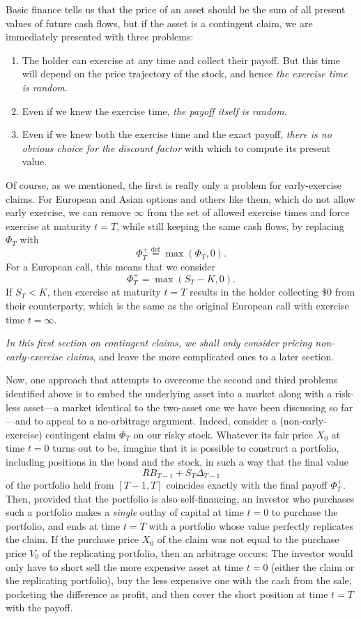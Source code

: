 \documentclass[reqno]{amsart}
\theoremstyle{definition}
\numberwithin{equation}{section}
\begin{document}
Basic finance tells us that the price of an asset should be the sum of all present values of future cash flows, but if the asset is a contingent claim, we are immediately presented with three problems:
\begin{enumerate}
\item The holder can exercise at any time and collect their payoff. But this time will depend on the price trajectory of the stock, and hence \textit{the exercise time is random.}
\item Even if we knew the exercise time, \textit{the payoff itself is random}.
\item Even if we knew both the exercise time and the exact payoff, \textit{there is no obvious choice for the discount factor} with which to compute its present value.
\end{enumerate}
Of course, as we mentioned, the first is really only a problem for early-exercise claims. For European and Asian options and others like them, which do not allow early exercise, we can remove $\infty$ from the set of allowed exercise times and force exercise at maturity $t=T$, while still keeping the same cash flows, by replacing $\Phi_T$ with
	\begin{equation}\label{eq:zero-trick}
	\Phi_T^+ \stackrel{\text{def}}{=} \max{\left(\Phi_T, 0\right)}.
	\end{equation}
For a European call, this means that we consider
	\[
	\Phi_T^+ = \max{\left(S_T - K, 0 \right)}.
	\]
If $S_T< K$, then exercise at maturity $t=T$ results in the holder collecting $\$0$ from their counterparty, which is the same as the original European call with exercise time $t=\infty$.

\textit{In this first section on contingent claims, we shall only consider pricing non-early-exercise claims}, and leave the more complicated ones to a later section.

Now, one approach that attempts to overcome the second and third problems identified above is to embed the underlying asset into a market along with a risk-less asset---a market identical to the two-asset one we have been discussing so far---and to appeal to a no-arbitrage argument. Indeed, consider a (non-early-exercise) contingent claim $\Phi_T$ on our risky stock. Whatever its fair price $X_0$ at time $t=0$ turns out to be, imagine that it is possible to construct a portfolio, including positions in the bond and the stock, in such a way that the final value
	\[
	RB_{T-1} + S_{T} \Delta_{T-1}
	\]
of the portfolio held from $[T-1, T]$ coincides exactly with the final payoff $\Phi_T^+$. Then, provided that the portfolio is also self-financing, an investor who purchases such a portfolio makes a \textit{single} outlay of capital at time $t=0$ to purchase the portfolio, and ends at time $t=T$ with a portfolio whose value perfectly replicates the claim. If the purchase price $X_0$ of the claim was not equal to the purchase price $V_0$ of the replicating portfolio, then an arbitrage occurs: The investor would only have to short sell the more expensive asset at time $t=0$ (either the claim or the replicating portfolio), buy the less expensive one with the cash from the sale, pocketing the difference as profit, and then cover the short position at time $t=T$ with the payoff.
\end{document}
